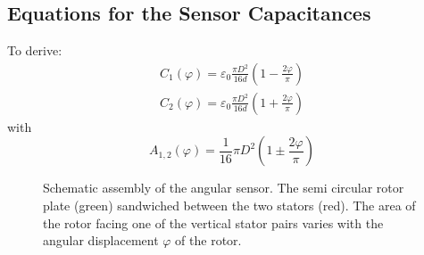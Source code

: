     \subsection{Equations for the Sensor Capacitances}\label{sec:preparation_task_5}
        To derive:
        \begin{align}
            C_1(\varphi) = \varepsilon_0 \frac{\pi D^2}{16 d} \left( 1 - \frac{2\varphi}{\pi} \right) \\
            C_2(\varphi) = \varepsilon_0 \frac{\pi D^2}{16 d} \left( 1 + \frac{2\varphi}{\pi} \right)
        \end{align}
        with
        \begin{equation}
            A_{1,2}(\varphi) = \frac{1}{16}\pi D^2 \left( 1 \pm \frac{2\varphi}{\pi} \right)
        \end{equation}
        \begin{figure}[h]
            \centering
            \caption[Schematic assembly of the angular sensor]{Schematic assembly of the angular sensor. The semi circular rotor plate (green) sandwiched between the two stators (red). The area of the rotor facing one of the vertical stator
            pairs varies with the angular displacement \( \varphi \)
            of the rotor.}
            \label{fig:rotorPositions}
        \end{figure}
